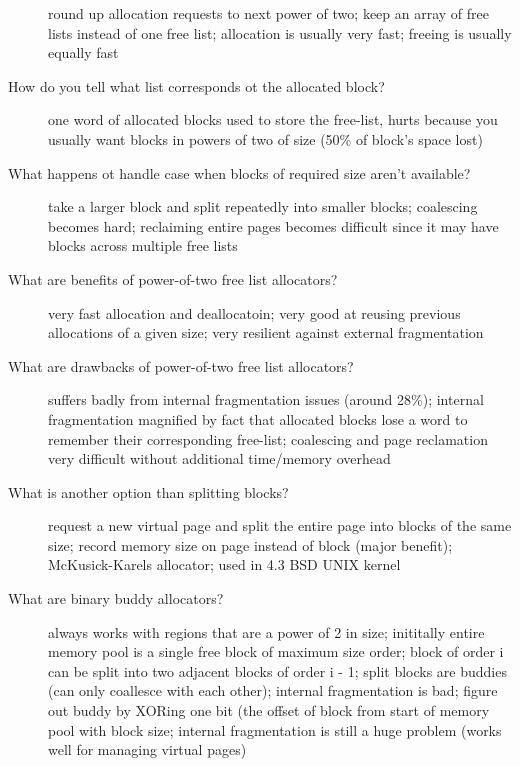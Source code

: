 \documentclass[10pt]{article}
\begin{document}
\begin{description}
  round up allocation requests to next power of two; keep an array of free lists instead of one free list;
  allocation is usually very fast; freeing is usually equally fast
\item[How do you tell what list corresponds ot the allocated block?]
  one word of allocated blocks used to store the free-list, hurts because you usually want blocks in powers of two of size (50\% of block's space lost)
\item[What happens ot handle case when blocks of required size aren't available?]
  take a larger block and split repeatedly into smaller blocks;
  coalescing becomes hard; reclaiming entire pages becomes difficult since it may have blocks across multiple free lists
\item[What are benefits of power-of-two free list allocators?]
  very fast allocation and deallocatoin;
  very good at reusing previous allocations of a given size;
  very resilient against external fragmentation
\item[What are drawbacks of power-of-two free list allocators?]
  suffers badly from internal fragmentation issues (around 28\%);
  internal fragmentation magnified by fact that allocated blocks lose a word to remember their corresponding free-list;
  coalescing and page reclamation very difficult without additional time/memory overhead
\item[What is another option than splitting blocks?]
  request a new virtual page and split the entire page into blocks of the same size;
  record memory size on page instead of block (major benefit);
  McKusick-Karels allocator;
  used in 4.3 BSD UNIX kernel
\item[What are binary buddy allocators?]
  always works with regions that are a power of 2 in size;
  inititally entire memory pool is a single free block of maximum size order;
  block of order i can be split into two adjacent blocks of order i - 1;
  split blocks are buddies (can only coallesce with each other);
  internal fragmentation is bad;
  figure out buddy by XORing one bit (the offset of block from start of memory pool with block size;
  internal fragmentation is still a huge problem (works well for managing virtual pages)
\end{description}
\end{document}
